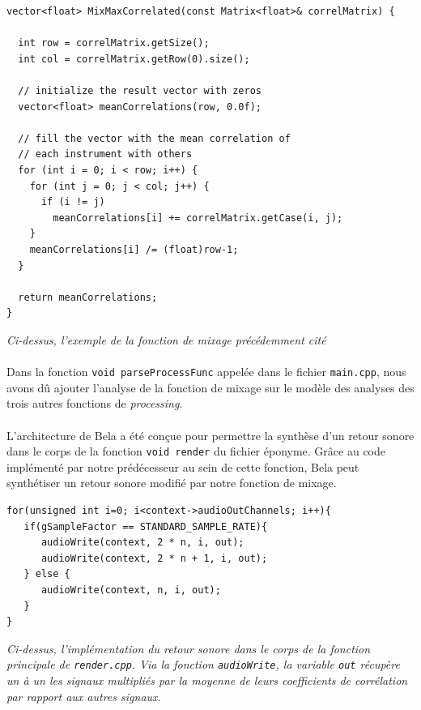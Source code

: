 \begin{lstlisting}
vector<float> MixMaxCorrelated(const Matrix<float>& correlMatrix) {

  int row = correlMatrix.getSize();
  int col = correlMatrix.getRow(0).size();

  // initialize the result vector with zeros
  vector<float> meanCorrelations(row, 0.0f);

  // fill the vector with the mean correlation of
  // each instrument with others
  for (int i = 0; i < row; i++) {
    for (int j = 0; j < col; j++) {
      if (i != j)
        meanCorrelations[i] += correlMatrix.getCase(i, j);
    }
    meanCorrelations[i] /= (float)row-1;
  }

  return meanCorrelations;
}
\end{lstlisting}

\begin{center}
 \textit{Ci-dessus, l'exemple de la fonction de mixage précédemment cité}
\end{center}

\paragraph{}
Dans la fonction \verb!void parseProcessFunc!  appelée dans le fichier
\verb!main.cpp!, nous avons dû ajouter l'analyse de la fonction de
mixage sur le modèle des analyses des trois autres fonctions de
\textit{processing}.

\paragraph{}
L'architecture de Bela a été conçue pour permettre la synthèse d'un
retour sonore dans le corps de la fonction \verb!void render! du
fichier éponyme. Grâce au code implémenté par notre prédécesseur au
sein de cette fonction, Bela peut synthétiser un retour sonore modifié
par notre fonction de mixage.

\begin{lstlisting}
for(unsigned int i=0; i<context->audioOutChannels; i++){
   if(gSampleFactor == STANDARD_SAMPLE_RATE){
      audioWrite(context, 2 * n, i, out);
      audioWrite(context, 2 * n + 1, i, out);
   } else {
      audioWrite(context, n, i, out);
   }
}
\end{lstlisting}

\begin{center} \textit{Ci-dessus, l'implémentation du retour sonore
  dans le corps de la fonction principale de \verb!render.cpp!. Via la
  fonction \verb!audioWrite!, la variable \verb!out! récupère un à un
  les signaux multipliés par la moyenne de leurs coefficients de
  corrélation par rapport aux autres signaux.} \end{center}

